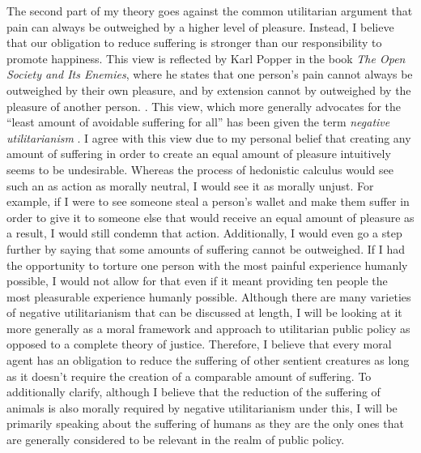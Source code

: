 \documentclass[12pt]{article}
\begin{document}
The second part of my theory goes against the common utilitarian argument that pain can always be outweighed by a higher level of pleasure.
Instead, I believe that our obligation to reduce suffering is stronger than our responsibility to promote happiness.
This view is reflected by Karl Popper in the book \textit{The Open Society and Its Enemies}, where he states that one person's pain cannot always be outweighed by their own pleasure, and by extension cannot by outweighed by the pleasure of another person. \autocite[285]{popper2002}.
This view, which more generally advocates for the ``least amount of avoidable suffering for all'' has been given the term \textit{negative utilitarianism} \autocite[542]{smart1958}.
I agree with this view due to my personal belief that creating any amount of suffering in order to create an equal amount of pleasure intuitively seems to be undesirable.
Whereas the process of hedonistic calculus would see such an as action as morally neutral, I would see it as morally unjust.
For example, if I were to see someone steal a person's wallet and make them suffer in order to give it to someone else that would receive an equal amount of pleasure as a result, I would still condemn that action.
Additionally, I would even go a step further by saying that some amounts of suffering cannot be outweighed.
If I had the opportunity to torture one person with the most painful experience humanly possible, I would not allow for that even if it meant providing ten people the most pleasurable experience humanly possible.
Although there are many varieties of negative utilitarianism that can be discussed at length, I will be looking at it more generally as a moral framework and approach to utilitarian public policy as opposed to a complete theory of justice.
Therefore, I believe that every moral agent has an obligation to reduce the suffering of other sentient creatures as long as it doesn't require the creation of a comparable amount of suffering.
To additionally clarify, although I believe that the reduction of the suffering of animals is also morally required by negative utilitarianism under this, I will be primarily speaking about the suffering of humans as they are the only ones that are generally considered to be relevant in the realm of public policy.
\end{document}
